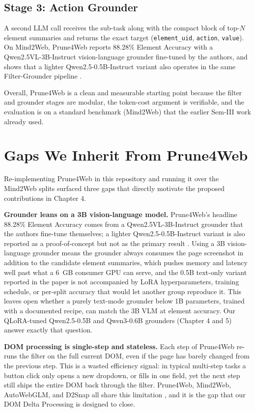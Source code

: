     \subsection{Stage 3: Action Grounder}
    A second LLM call receives the sub-task along with the compact block of top-$N$ element summaries and returns the exact target (\texttt{element\_uid}, \texttt{action}, \texttt{value}). On Mind2Web, Prune4Web reports 88.28\% Element Accuracy with a Qwen2.5VL-3B-Instruct vision-language grounder fine-tuned by the authors, and shows that a lighter Qwen2.5-0.5B-Instruct variant also operates in the same Filter-Grounder pipeline \cite{zhang2025prune4web}.

\noindent Overall, Prune4Web is a clean and measurable starting point because the filter and grounder stages are modular, the token-cost argument is verifiable, and the evaluation is on a standard benchmark (Mind2Web) that the earlier Sem-III work already used.


\section{Gaps We Inherit From Prune4Web}

Re-implementing Prune4Web in this repository and running it over the Mind2Web splits surfaced three gaps that directly motivate the proposed contributions in Chapter 4.

\textbf{Grounder leans on a 3B vision-language model.}
Prune4Web's headline 88.28\% Element Accuracy comes from a Qwen2.5VL-3B-Instruct grounder that the authors fine-tune themselves; a lighter Qwen2.5-0.5B-Instruct variant is also reported as a proof-of-concept but not as the primary result \cite{zhang2025prune4web}. Using a 3B vision-language grounder means the grounder always consumes the page screenshot in addition to the candidate element summaries, which pushes memory and latency well past what a 6~GB consumer GPU can serve, and the 0.5B text-only variant reported in the paper is not accompanied by LoRA hyperparameters, training schedule, or per-split accuracy that would let another group reproduce it. This leaves open whether a purely text-mode grounder below 1B parameters, trained with a documented recipe, can match the 3B VLM at element accuracy. Our QLoRA-tuned Qwen2.5-0.5B and Qwen3-0.6B grounders (Chapter 4 and 5) answer exactly that question.

\textbf{DOM processing is single-step and stateless.}
Each step of Prune4Web re-runs the filter on the full current DOM, even if the page has barely changed from the previous step. This is a wasted efficiency signal: in typical multi-step tasks a button click only opens a new dropdown, or fills in one field, yet the next step still ships the entire DOM back through the filter. Prune4Web, Mind2Web, AutoWebGLM, and D2Snap all share this limitation \cite{zhang2025prune4web} \cite{deng2023mind2webgeneralistagentweb} \cite{lai2024autowebglm} \cite{schiepanski2025d2snap}, and it is the gap that our DOM Delta Processing is designed to close.

